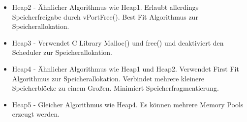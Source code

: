 \begin{itemize}
	\item Heap2 - Ähnlicher Algorithmus wie Heap1. Erlaubt allerdings Speicherfreigabe durch vPortFree(). Best Fit Algorithmus zur Speicherallokation. 
	\item Heap3 - Verwendet C Library Malloc() und free() und deaktiviert den Scheduler zur Speicherallokation.
	\item Heap4 - Ähnlicher Algorithmus wie Heap1 und Heap2. Verwendet First Fit Algorithmus zur Speicherallokation. Verbindet mehrere kleinere Speicherblöcke zu einem Großen. Minimiert Speicherfragmentierung.
	\item Heap5 - Gleicher Algorithmus wie Heap4. Es kön\-nen mehrere Memory Pools erzeugt werden.
\end{itemize}

